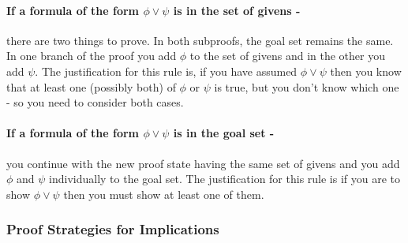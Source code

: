 \documentclass[11pt]{article}
\newcommand{\rbreak}{\ \\}
\newcommand{\NamedSequentRule}[3]{{\mbox{{\begin{tabular}{c} {\mbox{$#1$}}\vspace{.25em}\\ \hline \vspace{.25em} {\mbox{$#2$}} \end{tabular}}{\hspace{.5em}{#3}}}}}
\begin{document}
\paragraph{If a formula of the form $\phi\vee\psi$ is in the set of givens - }
there are two things to prove. In both subproofs, the goal set remains the
same.  In one branch of the proof you add $\phi$ to the set of givens and in
the other you add $\psi$.  The justification for this rule is, if you have
assumed $\phi\vee\psi$ then you know that at least one (possibly both) of
$\phi$ or $\psi$ is true, but you don't know which one - so you need to
consider both cases.

\paragraph{If a formula of the form $\phi\vee\psi$ is in the goal set - } you
continue with the new proof state having the same set of givens and you add
$\phi$ and $\psi$ individually to the goal set.  The justification for this
rule is if you are to show $\phi\vee\psi$ then you must show at least one of
them.



\subsubsection{Proof Strategies for Implications}
\end{document}
